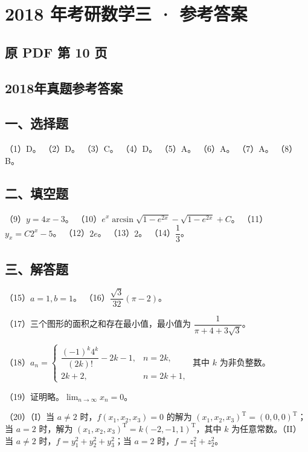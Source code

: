\documentclass[UTF8,12pt]{ctexart}
\begin{document}
\section*{2018 年考研数学三 · 参考答案}
\subsection*{原 PDF 第 10 页}

\subsection*{2018年真题参考答案}

\subsection*{一、选择题}

（1）D。 （2）D。 （3）C。 （4）D。 （5）A。 （6）A。 （7）A。 （8）B。


\subsection*{二、填空题}

（9）\(\displaystyle y=4x-3\)。 （10）\(\displaystyle e^x\arcsin\sqrt{1-e^{2x}}-\sqrt{1-e^{2x}}+C\)。 （11）\(\displaystyle y_x=C2^x-5\)。 （12）\(\displaystyle 2e\)。 （13）\(\displaystyle 2\)。 （14）\(\displaystyle \dfrac{\displaystyle 1}{\displaystyle 3}\)。


\subsection*{三、解答题}

（15）\(\displaystyle a=1,\allowbreak b=1\)。 （16）\(\displaystyle \dfrac{\displaystyle \sqrt3}{\displaystyle 32}(\pi-2)\)。


（17）三个图形的面积之和存在最小值，最小值为 \(\displaystyle \dfrac{\displaystyle 1}{\displaystyle \pi+4+3\sqrt3}\)。


（18）\(\displaystyle a_n=\begin{cases}\dfrac{\displaystyle (-1)^k4^k}{\displaystyle (2k)!}-2k-1,\allowbreak &n=2k,\allowbreak \\2k+2,\allowbreak &n=2k+1,\allowbreak \end{cases}\) 其中 \(\displaystyle k\) 为非负整数。


（19）证明略。\(\displaystyle \lim_{n\to\infty}x_n=0\)。


（20）（I）当 \(\displaystyle a\ne2\) 时，\(\displaystyle f(x_1,\allowbreak x_2,\allowbreak x_3)=0\) 的解为 \(\displaystyle (x_1,\allowbreak x_2,\allowbreak x_3)^{\mathrm T}=(0,\allowbreak 0,\allowbreak 0)^{\mathrm T}\)；当 \(\displaystyle a=2\) 时，解为 \(\displaystyle (x_1,\allowbreak x_2,\allowbreak x_3)^{\mathrm T}=k(-2,\allowbreak -1,\allowbreak 1)^{\mathrm T}\)，其中 \(\displaystyle k\) 为任意常数。（II）当 \(\displaystyle a\ne2\) 时，\(\displaystyle f=y_1^2+y_2^2+y_3^2\)；当 \(\displaystyle a=2\) 时，\(\displaystyle f=z_1^2+z_2^2\)。
\end{document}
